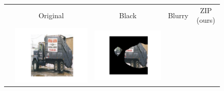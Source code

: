 \begin{figure}[t]
\newcommand{\sizeS}{.24}
\newcommand{\sizeP}{.165}
\newcommand{\hh}{.215\textwidth}
\newcommand{\ww}{.250\textwidth}
\setlength{\tabcolsep}{0pt}
\renewcommand{\arraystretch}{.2}
\centering
\footnotesize
\begin{tabular}{ccccc}
	& Original & Black & Blurry & ZIP (ours) \\
	\rotatebox{90}{~Image} & 
	\includegraphics[trim={28mm 10mm 39mm 10mm},clip,width=\sizeS\linewidth]{fig/7_207/image.png} & 
	\includegraphics[trim={28mm 10mm 39mm 10mm},clip,width=\sizeS\linewidth]{fig/7_207/black_image.png} & 

\end{tabular}
\end{figure}
